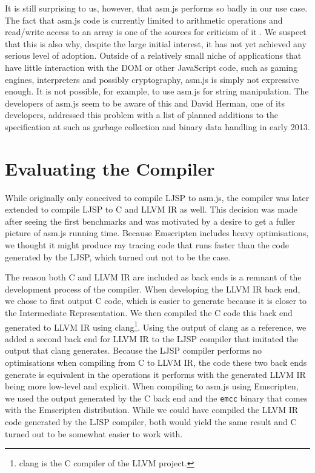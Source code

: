 \documentclass[11pt]{report}
\begin{document}
It is still surprising to us, however, that asm.js performs so badly in our use case. The fact that asm.js code is currently limited to arithmetic operations and read/write access to an array is one of the sources for criticism of it \cite{adblock, whybothers}. We suspect that this is also why, despite the large initial interest, it has not yet achieved any serious level of adoption. Outside of a relatively small niche of applications that have little interaction with the DOM or other JavaScript code, such as gaming engines, interpreters and possibly cryptography, asm.js is simply not expressive enough. It is not possible, for example, to use asm.js for string manipulation. The developers of asm.js seem to be aware of this and David Herman, one of its developers, addressed this problem with a list of planned additions to the specification at \cite{asmjsadditions} such as garbage collection and binary data handling in early 2013.

\section{Evaluating the Compiler}

While originally only conceived to compile LJSP to asm.js, the compiler was later extended to compile LJSP to C and LLVM IR as well. This decision was made after seeing the first benchmarks and was motivated by a desire to get a fuller picture of asm.js running time. Because Emscripten includes heavy optimisations, we thought it might produce ray tracing code that runs faster than the code generated by the LJSP, which turned out not to be the case. 

The reason both C and LLVM IR are included as back ends is a remnant of the development process of the compiler. When developing the LLVM IR back end, we chose to first output C code, which is easier to generate because it is closer to the Intermediate Representation. We then compiled the C code this back end generated to LLVM IR using clang\footnote{clang is the C compiler of the LLVM project.}. Using the output of clang as a reference, we added a second back end for LLVM IR to the LJSP compiler that imitated the output that clang generates. Because the LJSP compiler performs no optimisations when compiling from C to LLVM IR, the code these two back ends generate is equivalent in the operations it performs with the generated LLVM IR being more low-level and explicit. When compiling to asm.js using Emscripten, we used the output generated by the C back end and the \texttt{emcc} binary that comes with the Emscripten distribution. While we could have compiled the LLVM IR code generated by the LJSP compiler, both would yield the same result and C turned out to be somewhat easier to work with.
\end{document}
